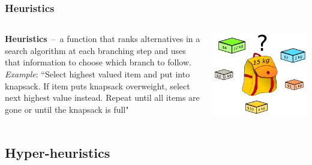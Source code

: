 \documentclass{beamer}
\newcommand{\linespace}{\vskip 0.25cm}
\begin{document}
\begin{frame}
	\frametitle{Heuristics}
	\begin{columns}
		\begin{column}{.6\textwidth}
			\textbf{Heuristics}~--~a function that ranks alternatives in a search algorithm at each branching step and uses that information to choose which branch to follow.
			\pause[3]
			\linespace
			\linespace
			\textit{Example}: ``Select highest valued item and put into knapsack. If item puts knapsack overweight, select next highest value instead. Repeat until all items are gone or until the knapsack is full"
		\end{column}
		\begin{column}{.4\textwidth}
			\pause[2]
			\includegraphics[height=.45\textheight]{Illustrations/knapsack.PNG}
			\\
		\end{column}
	\end{columns}
\end{frame}

\subsection{Hyper-heuristics}
\end{document}
